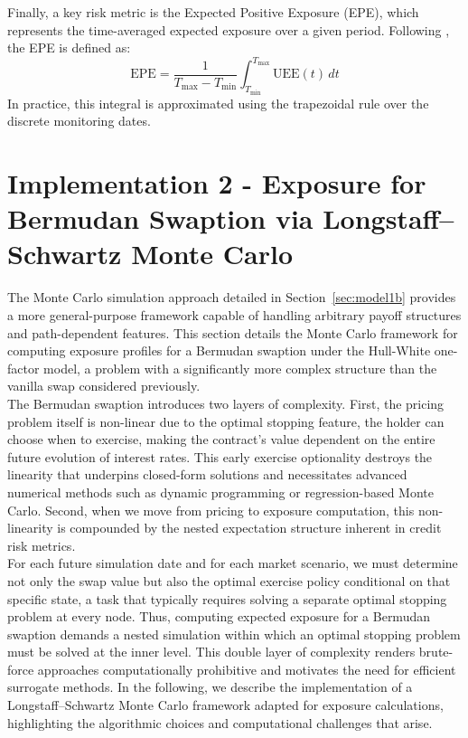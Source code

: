     \noindent
    Finally, a key risk metric is the Expected Positive Exposure (EPE), which represents the time-averaged expected exposure over a given period. Following \cite{Gregory_2015}, the EPE is defined as:
    \begin{equation}
        \text{EPE} = \frac{1}{T_{\text{max}} - T_{\text{min}}} \int_{T_{\text{min}}}^{T_{\text{max}}} \text{UEE}(t) \, dt
        \label{eq:epe}
    \end{equation}
    In practice, this integral is approximated using the trapezoidal rule over the discrete monitoring dates.
    
    \newpage 
    
\section{Implementation 2 - Exposure for Bermudan Swaption via Longstaff–Schwartz Monte Carlo}
    \noindent
    The Monte Carlo simulation approach detailed in Section~\ref{sec:model1b} provides a more general-purpose framework capable of handling arbitrary payoff structures and path-dependent features. This section details the Monte Carlo framework for computing exposure profiles for a Bermudan swaption under the Hull-White one-factor model, a problem with a significantly more complex structure than the vanilla swap considered previously. \\

    \noindent
    The Bermudan swaption introduces two layers of complexity. First, the pricing problem itself is non-linear due to the optimal stopping feature, the holder can choose when to exercise, making the contract's value dependent on the entire future evolution of interest rates. This early exercise optionality destroys the linearity that underpins closed-form solutions and necessitates advanced numerical methods such as dynamic programming or regression-based Monte Carlo. Second, when we move from pricing to exposure computation, this non-linearity is compounded by the nested expectation structure inherent in credit risk metrics. \\

    \noindent
    For each future simulation date and for each market scenario, we must determine not only the swap value but also the optimal exercise policy conditional on that specific state, a task that typically requires solving a separate optimal stopping problem at every node. Thus, computing expected exposure for a Bermudan swaption demands a nested simulation within which an optimal stopping problem must be solved at the inner level. This double layer of complexity renders brute-force approaches computationally prohibitive and motivates the need for efficient surrogate methods. In the following, we describe the implementation of a Longstaff–Schwartz Monte Carlo framework adapted for exposure calculations, highlighting the algorithmic choices and computational challenges that arise. \\


